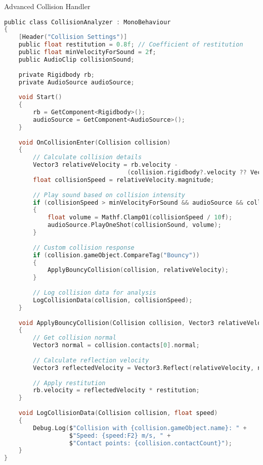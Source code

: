 \begin{code}{Advanced Collision Handler}\\
\begin{lstlisting}[language=C, style=basesmol]
public class CollisionAnalyzer : MonoBehaviour 
{
    [Header("Collision Settings")]
    public float restitution = 0.8f; // Coefficient of restitution
    public float minVelocityForSound = 2f;
    public AudioClip collisionSound;
    
    private Rigidbody rb;
    private AudioSource audioSource;
    
    void Start() 
    {
        rb = GetComponent<Rigidbody>();
        audioSource = GetComponent<AudioSource>();
    }
    
    void OnCollisionEnter(Collision collision) 
    {
        // Calculate collision details
        Vector3 relativeVelocity = rb.velocity - 
                                  (collision.rigidbody?.velocity ?? Vector3.zero);
        float collisionSpeed = relativeVelocity.magnitude;
        
        // Play sound based on collision intensity
        if (collisionSpeed > minVelocityForSound && audioSource && collisionSound) 
        {
            float volume = Mathf.Clamp01(collisionSpeed / 10f);
            audioSource.PlayOneShot(collisionSound, volume);
        }
        
        // Custom collision response
        if (collision.gameObject.CompareTag("Bouncy")) 
        {
            ApplyBouncyCollision(collision, relativeVelocity);
        }
        
        // Log collision data for analysis
        LogCollisionData(collision, collisionSpeed);
    }
    
    void ApplyBouncyCollision(Collision collision, Vector3 relativeVelocity) 
    {
        // Get collision normal
        Vector3 normal = collision.contacts[0].normal;
        
        // Calculate reflection velocity
        Vector3 reflectedVelocity = Vector3.Reflect(relativeVelocity, normal);
        
        // Apply restitution
        rb.velocity = reflectedVelocity * restitution;
    }
    
    void LogCollisionData(Collision collision, float speed) 
    {
        Debug.Log($"Collision with {collision.gameObject.name}: " +
                  $"Speed: {speed:F2} m/s, " +
                  $"Contact points: {collision.contactCount}");
    }
}
\end{lstlisting}
\end{code}

